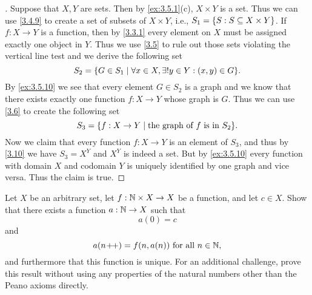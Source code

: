 \begin{proof}[]
	Suppose that \(X, Y\) are sets.
	Then by \cref{ex:3.5.1}(c), \(X \times Y\) is a set.
	Thus we can use \cref{3.4.9} to create a set of subsets of \(X \times Y\), i.e., \(S_1 = \left\lbrace S : S \subseteq X \times Y\right\rbrace\).
	If \(f : X \to Y\) is a function, then by \cref{3.3.1} every element on \(X\) must be assigned exactly one object in \(Y\).
	Thus we use \cref{3.5} to rule out those sets violating the vertical line test and we derive the following set
	\[
		S_2 = \set{G \in S_1 \mid \forall x \in X, \exists! y \in Y : (x, y) \in G}.
	\]
	By \cref{ex:3.5.10} we see that every element \(G \in S_2\) is a graph and we know that there exists exactly one function \(f : X \to Y\) whose graph is \(G\).
	Thus we can use \cref{3.6} to create the following set
	\[
		S_3 = \set{f : X \to Y \mid \text{the graph of } f \text{ is in } S_2}.
	\]
	Now we claim that every function \(f : X \to Y\) is an element of \(S_3\), and thus by \cref{3.10} we have \(S_3 = X^Y\) and \(X^Y\) is indeed a set.
	But by \cref{ex:3.5.10} every function with domain \(X\) and codomain \(Y\) is uniquely identified by one graph and vice versa.
	Thus the claim is true.
\end{proof}

\begin{ex}\label{ex:3.5.12}
	Let \(X\) be an arbitrary set, let \(f : \mathbb{N} \times X \to X\) be a function, and let \(c \in X\).
	Show that there exists a function \(a : \mathbb{N} \to X\) such that
	\[
		a(0) = c
	\]
	and
	\[
		a(n\!+\!\!+) = f(n, a(n)) \text{ for all } n \in \mathbb{N},
	\]
	and furthermore that this function is unique.
	For an additional challenge, prove this result without using any properties of the natural numbers other than the Peano axioms directly.
\end{ex}

